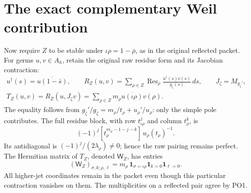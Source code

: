\documentclass[11pt]{article}
\newcommand{\Res}{\operatorname{Res}}
\begin{document}
\section{The exact complementary Weil contribution}

Now require \(Z\) to be stable under
\(\iota\rho=1-\bar\rho\), as in the original reflected packet.
For germs \(u,v\in A_h\), retain the original raw residue form
and its Jacobian contraction:
\[
 \begin{gathered}
 u^\dagger(s)=\overline{u(1-\bar s)},\qquad
 R_Z(u,v)=\sum_{\rho\in Z}
       \Res_\rho\frac{u^\dagger(s)v(s)}{g_\zeta(s)}\,ds,\qquad
 J_\zeta=M_{g_\zeta'},\\
 T_Z(u,v)=R_Z(u,J_\zeta v)
       =\sum_{\rho\in Z}m_\rho
                  \overline{u(\iota\rho)}v(\rho).
 \end{gathered}
 \tag{PO40}\label{po:trace}
\]
The equality follows from
\(g_\zeta'/g_\zeta=m_\rho/t_\rho+u_\rho'/u_\rho\):
only the simple pole contributes.
The full residue block, with row \(t_{\iota\rho}^j\) and
column \(t_\rho^k\), is
\[
 (-1)^j[t_\rho^{m_\rho-1-j-k}]\,u_\rho(t_\rho)^{-1}.
 \tag{PO41}\label{po:raw-matrix}
\]
Its antidiagonal is \((-1)^j/(2\lambda_\rho)\ne0\);
hence the raw pairing remains perfect. The Hermitian matrix
of \(T_Z\), denoted \(\mathsf W_Z\), has entries
\[
 (\mathsf W_Z)_{\sigma,k;\rho,\ell}
     =m_\rho\,\mathbf1_{\sigma=\iota\rho}
                \mathbf1_{k=0}\mathbf1_{\ell=0}.
 \tag{PO42}\label{po:WZ}
\]
All higher-jet coordinates remain in the packet even though
this particular contraction vanishes on them. The multiplicities
on a reflected pair agree by PO1.
\end{document}
